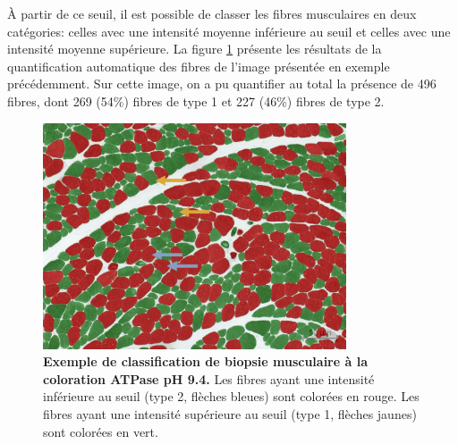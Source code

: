 À partir de ce seuil, il est possible de classer les fibres musculaires en deux catégories: celles avec une intensité moyenne inférieure au seuil et celles avec une intensité moyenne supérieure. La figure \ref{fig:apt_paint} présente les résultats de la quantification automatique des fibres de l'image présentée en exemple précédemment. Sur cette image, on a pu quantifier au total la présence de 496 fibres, dont 269 (54\%) fibres de type 1 et 227 (46\%) fibres de type 2. 
\begin{figure}[!ht]
 \centering
 \includegraphics[width=0.8\textwidth]{figures/atp_paint.png}
 \caption[Exemple de classification de biopsie musculaire à la coloration ATPase pH 9.4]{\textbf{Exemple de classification de biopsie musculaire à la coloration ATPase pH 9.4.} Les fibres ayant une intensité inférieure au seuil (type 2, flèches bleues) sont colorées en rouge. Les fibres ayant une intensité supérieure au seuil (type 1, flèches jaunes) sont colorées en vert.}
 \label{fig:apt_paint}
\end{figure}

